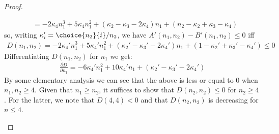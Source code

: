\begin{proof}
\begin{enumerate}
\begin{align*}
  &= -2\kappa_4n_1^3+5\kappa_4n_1^2+(\kappa_2-\kappa_3-2\kappa_4)n_1+(n_2-\kappa_2+\kappa_3-\kappa_4)
\end{align*}
so, writing $\kappa'_i=\choice{n_2}{i}/n_2$, we have $A'(n_1,n_2)-B'(n_1,n_2)\leq 0$ iff
\begin{align*}
D(n_1,n_2) = -2\kappa_4'n_1^3+5\kappa_4'n_1^2+(\kappa_2'-\kappa_3'-2\kappa_4')n_1+(1-\kappa_2'+\kappa_3'-\kappa_4')\leq0
\end{align*}
Differentiating $D(n_1,n_2)$ for $n_1$ we get:
\begin{align*}
\frac{\partial D}{\partial n_1}= -6\kappa_4'n_1^2+10\kappa_4'n_1+(\kappa_2'-\kappa_3'-2\kappa_4')
\end{align*}
By some elementary analysis we can see that the above is less or equal to 0 when $n_1,n_2\geq 4$. Given that $n_1\geq n_2$, it suffices to show that $D(n_2,n_2)\leq 0$ for $n_2\geq 4$. For the latter, we note that $D(4,4)< 0$ and that $D(n_2,n_2)$ is decreasing for $n\leq4$.
\end{enumerate}
\end{proof}


